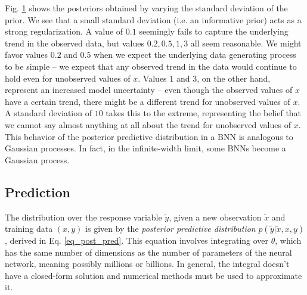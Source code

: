 \documentclass[12pt]{article}
\begin{document}
{Fig. \ref{fig_1d_predictions_by_stdev} shows the posteriors obtained by varying the standard deviation of the prior. We see that a small standard deviation (i.e. an informative prior) acts as a strong regularization. A value of $0.1$ seemingly fails to capture the underlying trend in the observed data, but values $0.2, 0.5, 1, 3$ all seem reasonable. We might favor values $0.2$ and $0.5$ when we expect the underlying data generating process to be simple -- we expect that any observed trend in the data would continue to hold even for unobserved values of $x$. Values $1$ and $3$, on the other hand, represent an increased model uncertainty -- even though the observed values of $x$ have a certain trend, there might be a different trend for unobserved values of $x$. A standard deviation of $10$ takes this to the extreme, representing the belief that we cannot say almost anything at all about the trend for unobserved values of $x$. This behavior of the posterior predictive distribution in a BNN is analogous to Gaussian processes. In fact, in the infinite-width limit, some BNNs become a Gaussian process. \cite{neural_tangents}

\begin{figure}[ht]
\centering
{}
\caption{}
\label{fig_1d_predictions_by_stdev}
\end{figure}

\subsection{Prediction}
\label{sec_prediction}

The distribution over the response variable $\tilde{y}$, given a new observation $\tilde{x}$ and training data $(x, y)$ is given by the \textit{posterior predictive distribution} $p(\tilde{y} | \tilde{x}, x, y)$, derived in Eq. \ref{eq_post_pred}. This equation involves integrating over $\theta$, which has the same number of dimensions as the number of parameters of the neural network, meaning possibly millions or billions. In general, the integral doesn't have a closed-form solution and numerical methods must be used to approximate it.

}
\end{document}
